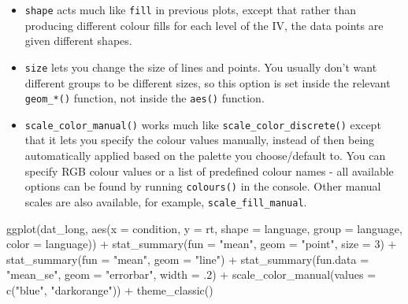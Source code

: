 \documentclass[
  english,
  doc,floatsintext]{apa6}
\newenvironment{Shaded}{\begin{snugshade}}{\end{snugshade}}
\newcommand{\AttributeTok}[1]{\textcolor[rgb]{0.77,0.63,0.00}{#1}}
\newcommand{\DecValTok}[1]{\textcolor[rgb]{0.00,0.00,0.81}{#1}}
\newcommand{\FunctionTok}[1]{\textcolor[rgb]{0.00,0.00,0.00}{#1}}
\newcommand{\NormalTok}[1]{#1}
\newcommand{\SpecialCharTok}[1]{\textcolor[rgb]{0.00,0.00,0.00}{#1}}
\newcommand{\StringTok}[1]{\textcolor[rgb]{0.31,0.60,0.02}{#1}}
\begin{document}
\begin{itemize}
\item
  \texttt{shape} acts much like \texttt{fill} in previous plots, except that rather than producing different colour fills for each level of the IV, the data points are given different shapes.
\item
  \texttt{size} lets you change the size of lines and points. You usually don't want different groups to be different sizes, so this option is set inside the relevant \texttt{geom\_*()} function, not inside the \texttt{aes()} function.
\item
  \texttt{scale\_color\_manual()} works much like \texttt{scale\_color\_discrete()} except that it lets you specify the colour values manually, instead of then being automatically applied based on the palette you choose/default to. You can specify RGB colour values or a list of predefined colour names - all available options can be found by running \texttt{colours()} in the console. Other manual scales are also available, for example, \texttt{scale\_fill\_manual}.
\end{itemize}

\begin{Shaded}
\begin{Highlighting}[]
\FunctionTok{ggplot}\NormalTok{(dat\_long, }\FunctionTok{aes}\NormalTok{(}\AttributeTok{x =}\NormalTok{ condition, }\AttributeTok{y =}\NormalTok{ rt, }
                     \AttributeTok{shape =}\NormalTok{ language,}
                     \AttributeTok{group =}\NormalTok{ language,}
                     \AttributeTok{color =}\NormalTok{ language)) }\SpecialCharTok{+}
  \FunctionTok{stat\_summary}\NormalTok{(}\AttributeTok{fun =} \StringTok{"mean"}\NormalTok{, }\AttributeTok{geom =} \StringTok{"point"}\NormalTok{, }\AttributeTok{size =} \DecValTok{3}\NormalTok{) }\SpecialCharTok{+}
  \FunctionTok{stat\_summary}\NormalTok{(}\AttributeTok{fun =} \StringTok{"mean"}\NormalTok{, }\AttributeTok{geom =} \StringTok{"line"}\NormalTok{) }\SpecialCharTok{+}
  \FunctionTok{stat\_summary}\NormalTok{(}\AttributeTok{fun.data =} \StringTok{"mean\_se"}\NormalTok{, }\AttributeTok{geom =} \StringTok{"errorbar"}\NormalTok{, }\AttributeTok{width =}\NormalTok{ .}\DecValTok{2}\NormalTok{) }\SpecialCharTok{+}
  \FunctionTok{scale\_color\_manual}\NormalTok{(}\AttributeTok{values =} \FunctionTok{c}\NormalTok{(}\StringTok{"blue"}\NormalTok{, }\StringTok{"darkorange"}\NormalTok{)) }\SpecialCharTok{+}
  \FunctionTok{theme\_classic}\NormalTok{()}
\end{Highlighting}
\end{Shaded}
\end{document}
